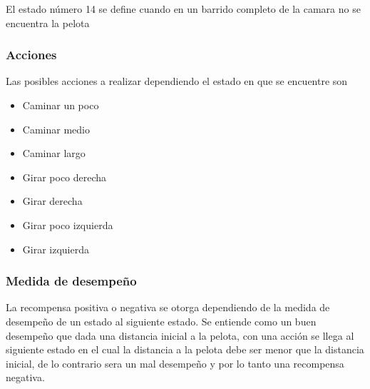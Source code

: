 El estado n\'umero 14 se define cuando en un barrido completo de la camara no se encuentra la pelota

\subsubsection{Acciones}

Las posibles acciones a realizar dependiendo el estado en que se encuentre son 

\begin{itemize}
\item Caminar un poco 
\item Caminar medio
\item Caminar largo
\item Girar poco derecha
\item Girar derecha
\item Girar poco izquierda
\item Girar izquierda
\end{itemize}

\subsubsection{Medida de desempeño}

La recompensa positiva o negativa se otorga dependiendo de la medida de desempeño de un estado al siguiente estado. Se entiende como un buen desempeño que dada una distancia inicial a la pelota, con una acción se llega al siguiente estado en el cual la distancia a la pelota debe ser menor que la distancia inicial, de lo contrario sera un mal desempeño y por lo tanto una recompensa negativa.


